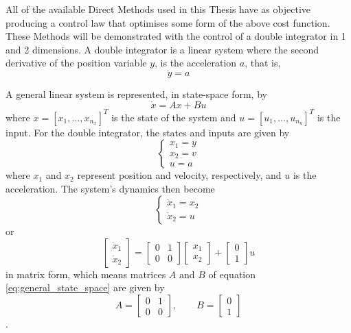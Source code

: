 \par All of the available Direct Methods used in this Thesis have as objective producing a control law that optimises some form of the above cost function. These Methods will be demonstrated with the control of a double integrator in 1 and 2 dimensions. A double integrator is a linear system where the second derivative of the position variable $y$, is the acceleration $a$, that is,
\begin{equation}
    \ddot{y} = a
    \label{eq:basic_double_int}
\end{equation}
\par A general linear system is represented, in state-space form, by
\begin{equation}
    \dot{x} = Ax + Bu
    \label{eq:general_state_space}
\end{equation}
where $x = [x_1,\dots,x_{n_x}]^T$ is the state of the system and $u = [u_1,\dots,u_{n_u}]^T$ is the input. For the double integrator, the states and inputs are given by
\begin{equation}
\begin{cases}
    x_1 = y \\ x_2 = v \\ u = a
\end{cases}
\end{equation}
where $x_1$ and $x_2$ represent position and velocity, respectively, and $u$ is the acceleration. The system's dynamics then become
\begin{equation}
    \label{eq:dynamics_double_int}
    \begin{cases}
        \dot{x}_1 = x_2 \\
        \dot{x}_2 = u
    \end{cases}
\end{equation}
or
\begin{equation}
    \begin{bmatrix}
    \dot{x}_1 \\ \dot{x}_2
    \end{bmatrix} = 
    \begin{bmatrix} 0 & 1 \\ 0 & 0 \end{bmatrix} 
    \begin{bmatrix} x_1 \\ x_2 \end{bmatrix} + 
    \begin{bmatrix} 0 \\ 1 \end{bmatrix} u
    \label{eq:state_space_double_int}
\end{equation}
in matrix form, which means matrices $A$ and $B$ of equation \ref{eq:general_state_space} are given by
\begin{equation}
    A = \begin{bmatrix} 0 & 1 \\ 0 & 0 \end{bmatrix}, \qquad B = \begin{bmatrix} 0 \\ 1 \end{bmatrix}
    \label{eq:A_and_B}
\end{equation}.

